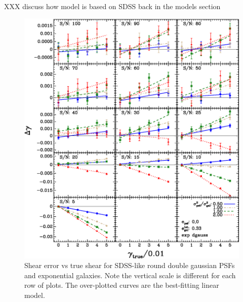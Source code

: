 \documentclass[10pt,preprint]{aastex}
\newcommand{\psf}{PSF}
\begin{document}
XXX discuss how model is based on SDSS back in the models section


\begin{figure}[p] \centering
 \centering 
 \includegraphics[scale=1.1]{figures/set-s2n-edg02-vs-shear.eps}

 \caption{Shear error vs true shear for SDSS-like round double gaussian \psf s
 and exponential galaxies.  Note the vertical scale is different for each row
 of plots.  The over-plotted curves are the best-fitting linear model.}
 \label{fig:edgdiffvsshroundpsf}

\end{figure}
\end{document}
